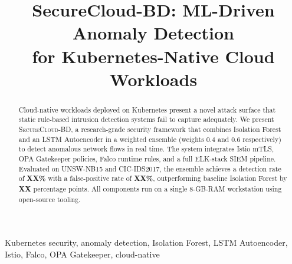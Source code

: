 \documentclass[10pt,conference]{IEEEtran}
\begin{document}
\title{SecureCloud-BD: ML-Driven Anomaly Detection\\
for Kubernetes-Native Cloud Workloads}

\author{
}

\maketitle

\begin{abstract}
Cloud-native workloads deployed on Kubernetes present a novel attack surface
that static rule-based intrusion detection systems fail to capture adequately.
We present \textsc{SecureCloud-BD}, a research-grade security framework that
combines Isolation Forest and an LSTM Autoencoder in a weighted ensemble
(weights 0.4 and 0.6 respectively) to detect anomalous network flows in real
time. The system integrates Istio mTLS, OPA Gatekeeper policies, Falco runtime
rules, and a full ELK-stack SIEM pipeline.
Evaluated on UNSW-NB15 and CIC-IDS2017, the ensemble achieves a detection
rate of \textbf{XX\%} with a false-positive rate of \textbf{XX\%}, outperforming
baseline Isolation Forest by \textbf{XX} percentage points.
All components run on a single 8-GB-RAM workstation using open-source tooling.
\end{abstract}

\begin{IEEEkeywords}
Kubernetes security, anomaly detection, Isolation Forest, LSTM Autoencoder,
Istio, Falco, OPA Gatekeeper, cloud-native
\end{IEEEkeywords}











\end{document}
